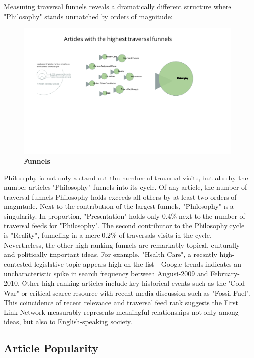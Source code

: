 \documentclass[pre,twocolumn,twoside,superscriptaddress,floatfix, aps, 10pt]{revtex4-1}
\newcommand{\red}[1]{{\leavevmode\color{sred}{#1}}} %
\begin{document}
Measuring traversal funnels reveals a dramatically different structure where "Philosophy" stands unmatched by orders of magnitude:
\begin{figure}[tp!]
  \centering	
  \includegraphics[width=\textwidth]{graphics/funnels.pdf}
  \caption{
    \textbf{Funnels}
  }
  \label{fig:Funnels}
\end{figure}

Philosophy is not only a stand out the number of traversal visits, but also by the number articles "Philosophy" funnels into
its cycle. Of any article, the number of traversal funnels Philosophy holds exceeds 
all others by at least two orders of magnitude.
Next to the contribution of the largest funnels, "Philosophy" is a singularity. 
In proportion, "Presentation" holds only $0.4\%$ next to the number of traversal feeds for "Philosophy".
The second contributor to the Philosophy cycle is "Reality", funneling in a mere $0.2\%$ of traversals visits in the cycle.
Nevertheless, the other high ranking funnels are remarkably topical, culturally and politically important ideas.  For example, "Health Care", a recently high-contested legislative topic appears high on the list---Google trends indicates an uncharacteristic spike in search frequency between August-2009 and February-2010.
Other high ranking articles include key historical events such as the "Cold War" or critical scarce resource with recent 
media discussion such as "Fossil Fuel".
This coincidence of recent relevance and traversal feed rank suggests the First Link Network measurably represents
meaningful relationships not only among ideas, but also to English-speaking society. 

\red{TODO: add two regimes for power-law distribution}

\subsection{Article Popularity}
\end{document}
